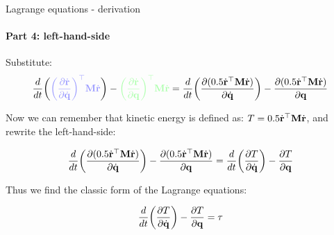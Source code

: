 \documentclass{beamer}
\begin{document}
\begin{frame}{Lagrange equations - derivation}
\framesubtitle{Part 4: left-hand-side}
\begin{flushleft}

Substitute:
\[    
    \frac{d}{dt} \bigg( 
    \textcolor{myblue}{ \bigg( \frac{\partial \dot{\bo{r}}}{\partial \dot{\bo{q}}} \bigg) ^\top
    \bo{M} \dot{\bo{r}} }
    \bigg) - 
    \textcolor{mygreen}{\bigg( \frac{\partial \dot{\bo{r}}}{\partial \bo{q}} \bigg) ^\top
    \bo{M} \dot{\bo{r}}} 
    =
    \frac{d}{dt} \bigg( 
   \frac{\partial ( 0.5 \dot{\bo{r}} ^\top \bo{M} \dot{\bo{r}}) }{\partial \dot{\bo{q}}}
    \bigg) - 
    \frac{\partial (0.5 \dot{\bo{r}}^\top \bo{M} \dot{\bo{r}})}{\partial \bo{q}}
\]

Now we can remember that kinetic energy is defined as: $T = 0.5 \dot{\mathbf{r}} ^\top \mathbf{M} \dot{\mathbf{r}}$, and rewrite the left-hand-side:

\[    
    \frac{d}{dt} \bigg( 
   \frac{\partial ( 0.5 \dot{\mathbf{r}} ^\top \mathbf{M} \dot{\mathbf{r}}) }{\partial \dot{\mathbf{q}}}
    \bigg) - 
    \frac{\partial (0.5 \dot{\mathbf{r}}^\top \mathbf{M} \dot{\mathbf{r}})}{\partial \mathbf{q}}
    =
    \frac{d}{dt} \bigg( 
   \frac{\partial T }{\partial \dot{\mathbf{q}}}
    \bigg) - 
    \frac{\partial T }{\partial \mathbf{q}}
\]

\bigskip

Thus we find the classic form of the Lagrange equations:

\begin{equation}
    \frac{d}{dt} \bigg( 
   \frac{\partial T }{\partial \dot{\mathbf{q}}}
    \bigg) - 
    \frac{\partial T }{\partial \mathbf{q}} = \tau
\end{equation}


\end{flushleft}
\end{frame}
\end{document}
